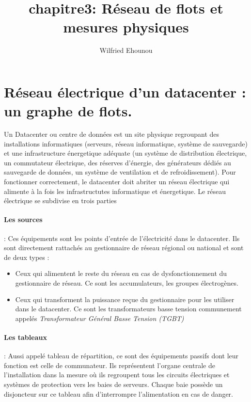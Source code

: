\documentclass[onecolumn, 12pt]{article}
\title{chapitre3: R\'eseau de flots et mesures physiques}
\author{Wilfried Ehounou}
\date{\oldstylenums{\today}}
\begin{document}
\maketitle
\tableofcontents

\section{R\'eseau \'electrique d'un datacenter : un graphe de flots.}
Un Datacenter ou centre de donn\'ees est un site physique regroupant des installations informatiques (serveurs, r\'eseau informatique, syst\`eme de sauvegarde) et une infrastructure \'energetique ad\'equate (un syst\`eme de distribution \'electrique, un commutateur \'electrique, des r\'eserves d'\'energie, des g\'en\'erateurs d\'edi\'es au sauvegarde de donn\'ees, un syst\`eme de ventilation et de refroidissement).
Pour  fonctionner correctement, le datacenter doit abriter un r\'eseau \'electrique qui alimente \`a la fois les infrastructutes informatique et \'energetique. 
\newline
Le r\'eseau \'electrique se subdivise en trois parties
\paragraph{Les sources}: 
Ces \'equipements sont les points d'entr\'ee de l'\'electricit\'e dans le datacenter. 
Ils sont directement rattach\'es au gestionnaire de r\'eseau r\'egional ou national et sont de deux types : 
\begin{itemize}
\item Ceux qui alimentent le reste du r\'eseau en cas de dysfonctionnement du gestionnaire de r\'eseau. Ce sont les accumulateurs, les groupes \'electrog\`enes.
\item Ceux qui transforment la puissance re\c cue du gestionnaire pour les utiliser dans le datacenter. Ce sont les transformateurs basse tension communement appel\'es {\em Transformateur G\'en\'eral Basse Tension (TGBT)} 
\end{itemize}
\paragraph{Les tableaux}:
Aussi appel\'e tableau de r\'epartition, ce sont des \'equipements passifs dont leur fonction est celle de communateur. 
Ils repr\'esentent l'organe centrale de l'installation dans la mesure o\`u ils regroupent tous les circuits \'electriques et syst\`emes de protection vers les baies de serveurs. Chaque baie poss\`ede un disjoncteur sur ce tableau afin d'interrompre l'alimentation en cas de danger. 
\end{document}
